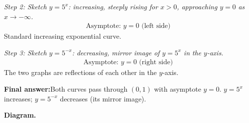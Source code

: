 \documentclass[11pt]{article}
\begin{document}
\textit{Step 2: Sketch \( y = 5^x \): increasing, steeply rising for \( x > 0 \), approaching \( y = 0 \) as \( x \to -\infty \).}
\[\begin{gathered}
\text{Asymptote: } y = 0 \text{ (left side)}
\end{gathered}\]
Standard increasing exponential curve.

\textit{Step 3: Sketch \( y = 5^{-x} \): decreasing, mirror image of \( y = 5^x \) in the \( y \)-axis.}
\[\begin{gathered}
\text{Asymptote: } y = 0 \text{ (right side)}
\end{gathered}\]
The two graphs are reflections of each other in the \( y \)-axis.

\begin{answerbox}
\textbf{Final answer:}\quad Both curves pass through \(\displaystyle  (0,1) \) with asymptote \(\displaystyle  y=0 \). \(\displaystyle  y=5^x \) increases; \(\displaystyle  y=5^{-x} \) decreases (its mirror image).
\end{answerbox}
\textbf{Diagram.}
\end{document}
